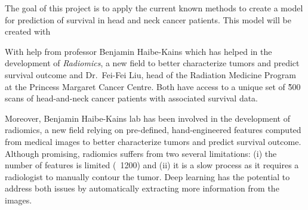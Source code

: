 \documentclass[a4paper, 12pt]{article}
\begin{document}
The goal of this project is to apply the current known methods to create a model for prediction
of survival in head and neck cancer patients. This model will be created with 

With help from professor Benjamin Haibe-Kains which has helped in the development of 
\emph{Radiomics}, a new field to better characterize tumors and predict survival outcome and 
Dr.~Fei-Fei Liu, head of the Radiation Medicine Program at the Princess Margaret Cancer Centre. 
Both have access to a unique set of \~500 scans of head-and-neck cancer patients with associated 
survival data. 

Moreover, Benjamin Haibe-Kains lab has been involved in the development of radiomics, a new field 
relying on pre-defined, hand-engineered features computed from medical images to better characterize 
tumors and predict survival outcome. Although promising, radiomics suffers from two several 
limitations: (i) the number of features is limited (~1200) and (ii) it is a slow process as it 
requires a radiologist to manually contour the tumor. Deep learning has the potential to
address both issues by automatically extracting more information from the images.
~\cite{deep-learning-radiomics-gbm}
\end{document}
